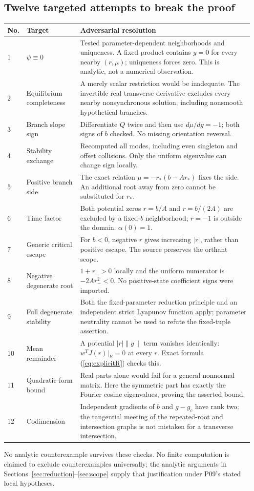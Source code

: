 \documentclass[11pt]{article}
\newcommand{\norm}[1]{\lVert#1\rVert}
\begin{document}
\subsection{Twelve targeted attempts to break the proof}
\begin{longtable}{@{}p{}p{}p{}@{}}
\toprule No. & Target & Adversarial resolution\\\midrule\endhead
1 & $\psi\equiv0$ & Tested parameter-dependent neighborhoods and uniqueness.
A fixed product contains $y=0$ for every nearby $(r,\mu)$; uniqueness forces
zero. This is analytic, not a numerical observation.\\
2 & Equilibrium completeness & A merely scalar restriction would be inadequate.
The invertible real transverse derivative excludes every nearby
nonsynchronous solution, including nonsmooth hypothetical branches.\\
3 & Branch slope sign & Differentiate $Q$ twice and then use $d\mu/dg=-1$;
both signs of $b$ checked. No missing orientation reversal.\\
4 & Stability exchange & Recomputed all modes, including even singleton and
offset collisions. Only the uniform eigenvalue can change sign locally.\\
5 & Positive branch side & The exact relation $\mu=-r_*(b-Ar_*)$ fixes the
side. An additional root away from zero cannot be substituted for $r_*$.\\
6 & Time factor & Both potential zeros $r=b/A$ and $r=b/(2A)$ are excluded
by a fixed-$b$ neighborhood; $r=-1$ is outside the domain. $\alpha(0)=1$.\\
7 & Generic critical escape & For $b<0$, negative $r$ gives increasing
$|r|$, rather than positive escape. The source preserves the orthant scope.\\
8 & Negative degenerate root & $1+r_->0$ locally and the uniform numerator
is $-2Ar_-^2<0$. No positive-state coefficient signs were imported.\\
9 & Full degenerate stability & Both the fixed-parameter reduction principle
and an independent strict Lyapunov function apply; parameter neutrality
cannot be used to refute the fixed-tuple assertion.\\
10 & Mean remainder & A potential $|r|\norm y$ term vanishes identically:
$w^TJ(r)|_E=0$ at every $r$. Exact formula (\ref{eq:explicitR}) checks this.\\
11 & Quadratic-form bound & Real parts alone would fail for a general
nonnormal matrix. Here the symmetric part has exactly the Fourier cosine
eigenvalues, proving the asserted bound.\\
12 & Codimension & Independent gradients of $b$ and $g-g_c$ have rank two;
the tangential meeting of the repeated-root and intersection graphs is
not mistaken for a transverse intersection.\\
\bottomrule
\end{longtable}
No analytic counterexample survives these checks. No finite computation
is claimed to exclude counterexamples universally; the analytic arguments
in Sections~\ref{sec:reduction}--\ref{sec:scope} supply that justification
under P09's stated local hypotheses.
\end{document}
